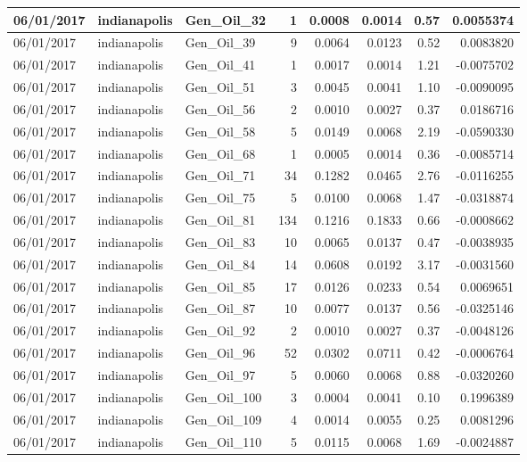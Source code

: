 \documentclass[
  letterpaper,
  DIV=11,
  numbers=noendperiod]{scrartcl}
\begin{document}
\begin{tabular}{l|l|l|r|r|r|r|r}
\hline
06/01/2017 & indianapolis & Gen\_Oil\_32 & 1 & 0.0008 & 0.0014 & 0.57 & 0.0055374\\
\hline
06/01/2017 & indianapolis & Gen\_Oil\_39 & 9 & 0.0064 & 0.0123 & 0.52 & 0.0083820\\
\hline
06/01/2017 & indianapolis & Gen\_Oil\_41 & 1 & 0.0017 & 0.0014 & 1.21 & -0.0075702\\
\hline
06/01/2017 & indianapolis & Gen\_Oil\_51 & 3 & 0.0045 & 0.0041 & 1.10 & -0.0090095\\
\hline
06/01/2017 & indianapolis & Gen\_Oil\_56 & 2 & 0.0010 & 0.0027 & 0.37 & 0.0186716\\
\hline
06/01/2017 & indianapolis & Gen\_Oil\_58 & 5 & 0.0149 & 0.0068 & 2.19 & -0.0590330\\
\hline
06/01/2017 & indianapolis & Gen\_Oil\_68 & 1 & 0.0005 & 0.0014 & 0.36 & -0.0085714\\
\hline
06/01/2017 & indianapolis & Gen\_Oil\_71 & 34 & 0.1282 & 0.0465 & 2.76 & -0.0116255\\
\hline
06/01/2017 & indianapolis & Gen\_Oil\_75 & 5 & 0.0100 & 0.0068 & 1.47 & -0.0318874\\
\hline
06/01/2017 & indianapolis & Gen\_Oil\_81 & 134 & 0.1216 & 0.1833 & 0.66 & -0.0008662\\
\hline
06/01/2017 & indianapolis & Gen\_Oil\_83 & 10 & 0.0065 & 0.0137 & 0.47 & -0.0038935\\
\hline
06/01/2017 & indianapolis & Gen\_Oil\_84 & 14 & 0.0608 & 0.0192 & 3.17 & -0.0031560\\
\hline
06/01/2017 & indianapolis & Gen\_Oil\_85 & 17 & 0.0126 & 0.0233 & 0.54 & 0.0069651\\
\hline
06/01/2017 & indianapolis & Gen\_Oil\_87 & 10 & 0.0077 & 0.0137 & 0.56 & -0.0325146\\
\hline
06/01/2017 & indianapolis & Gen\_Oil\_92 & 2 & 0.0010 & 0.0027 & 0.37 & -0.0048126\\
\hline
06/01/2017 & indianapolis & Gen\_Oil\_96 & 52 & 0.0302 & 0.0711 & 0.42 & -0.0006764\\
\hline
06/01/2017 & indianapolis & Gen\_Oil\_97 & 5 & 0.0060 & 0.0068 & 0.88 & -0.0320260\\
\hline
06/01/2017 & indianapolis & Gen\_Oil\_100 & 3 & 0.0004 & 0.0041 & 0.10 & 0.1996389\\
\hline
06/01/2017 & indianapolis & Gen\_Oil\_109 & 4 & 0.0014 & 0.0055 & 0.25 & 0.0081296\\
\hline
06/01/2017 & indianapolis & Gen\_Oil\_110 & 5 & 0.0115 & 0.0068 & 1.69 & -0.0024887\\

\end{tabular}
\end{document}
